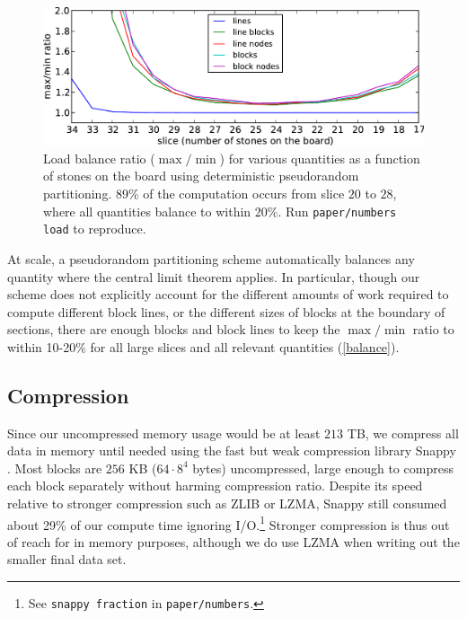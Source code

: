 \documentclass[conference]{IEEEtran}
\begin{document}
\begin{figure}
\begin{center}
\includegraphics[width=\columnwidth]{balance.pdf}
\end{center}
\vspace{-.1in}
\cprotect\caption{Load balance ratio ($\max/\min$) for various quantities as a function of stones on the board using
deterministic pseudorandom partitioning.  89\% of the computation occurs from slice $20$ to $28$, where
all quantities balance to within 20\%.  Run \verb+paper/numbers load+ to reproduce.}
\label{balance}
\vspace{-.1in}
\end{figure}

At scale, a pseudorandom partitioning scheme automatically balances any quantity where the central limit
theorem applies.  In particular, though our scheme does not explicitly account for the different amounts of
work required to compute different block lines, or the different sizes of blocks at the boundary of sections,
there are enough blocks and block lines to keep the $\max/\min$ ratio to within 10-20\% for all large slices and
all relevant quantities (\autoref{balance}).

\subsection{Compression}

Since our uncompressed memory usage would be at least $213$ TB, we compress all data in memory until needed
using the fast but weak compression library Snappy \cite{snappy2014}.  Most blocks are $256$ KB
($64 \cdot 8^4$ bytes) uncompressed, large enough to compress each block separately without harming compression ratio.
Despite its speed relative to stronger compression such as ZLIB or LZMA\cite{deutsch1996zlib,xz2014}, Snappy still consumed about 29\% of our
compute time ignoring I/O.\cprotect\footnote{See \verb+snappy fraction+ in \verb+paper/numbers+.}  Stronger
compression is thus out of reach for in memory purposes, although we do use LZMA when writing
out the smaller final data set.
\end{document}
